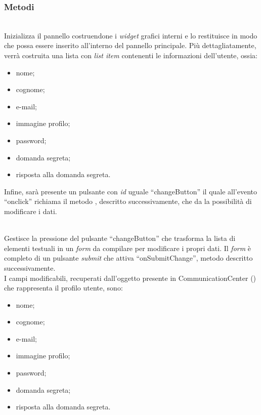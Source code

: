 \subsubsection*{Metodi}
\begin{description}
\item{}\\
Inizializza il pannello costruendone i \textit{widget} grafici interni e lo restituisce in modo che possa essere inserito all'interno del pannello principale. Più dettagliatamente, verrà costruita una lista con \textit{list item} contenenti le informazioni dell'utente, ossia:
\begin{itemize}
\item nome;
\item cognome;
\item e-mail;
\item immagine profilo;
\item password;
\item domanda segreta;
\item risposta alla domanda segreta.
\end{itemize}
Infine, sarà presente un pulsante con \textit{id} uguale ``changeButton'' il quale all'evento ``onclick'' richiama il metodo , descritto successivamente, che da la possibilità di modificare i dati.


\item{}\\
Gestisce la pressione del pulsante ``changeButton'' che trasforma la lista di elementi testuali in un \textit{form} da compilare per modificare i propri dati. Il \textit{form} è completo di un pulsante \textit{submit} che attiva ``onSubmitChange'', metodo descritto successivamente.\\
I campi modificabili, recuperati dall'oggetto presente in CommunicationCenter () che rappresenta il profilo utente, sono:
\begin{itemize}
\item nome;
\item cognome;
\item e-mail;
\item immagine profilo;
\item password;
\item domanda segreta;
\item risposta alla domanda segreta.
\end{itemize}


\end{description}
